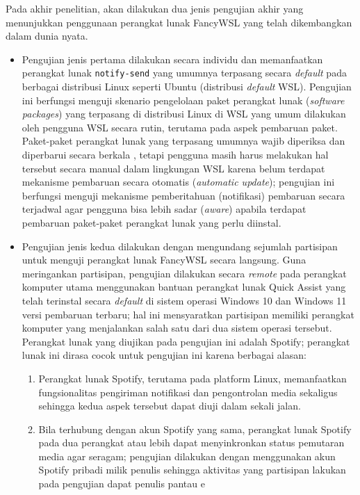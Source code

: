 Pada akhir penelitian, akan dilakukan dua jenis pengujian akhir yang menunjukkan penggunaan perangkat lunak FancyWSL yang telah dikembangkan dalam dunia nyata.
\begin{itemize}
    \item Pengujian jenis pertama dilakukan secara individu dan memanfaatkan perangkat lunak \verb|notify-send| yang umumnya terpasang secara \textit{default} pada berbagai distribusi Linux seperti Ubuntu (distribusi \textit{default} WSL). Pengujian ini berfungsi menguji skenario pengelolaan paket perangkat lunak (\textit{software packages}) yang terpasang di distribusi Linux di WSL yang umum dilakukan oleh pengguna WSL secara rutin, terutama pada aspek pembaruan paket. Paket-paket perangkat lunak yang terpasang umumnya wajib diperiksa dan diperbarui secara berkala \cite{legay2020package}, tetapi pengguna masih harus melakukan hal tersebut secara manual dalam lingkungan WSL karena belum terdapat mekanisme pembaruan secara otomatis (\textit{automatic update}); pengujian ini berfungsi menguji mekanisme pemberitahuan (notifikasi) pembaruan secara terjadwal agar pengguna bisa lebih sadar (\textit{aware}) apabila terdapat pembaruan paket-paket perangkat lunak yang perlu diinstal.

    \item Pengujian jenis kedua dilakukan dengan mengundang sejumlah partisipan untuk menguji perangkat lunak FancyWSL secara langsung. Guna meringankan partisipan, pengujian dilakukan secara \textit{remote} pada perangkat komputer utama menggunakan bantuan perangkat lunak Quick Assist yang telah terinstal secara \textit{default} di sistem operasi Windows 10 dan Windows 11 versi pembaruan terbaru; hal ini mensyaratkan partisipan memiliki perangkat komputer yang menjalankan salah satu dari dua sistem operasi tersebut. Perangkat lunak yang diujikan pada pengujian ini adalah Spotify; perangkat lunak ini dirasa cocok untuk pengujian ini karena berbagai alasan:
    \begin{enumerate}
        \item Perangkat lunak Spotify, terutama pada platform Linux, memanfaatkan fungsionalitas pengiriman notifikasi dan pengontrolan media sekaligus sehingga kedua aspek tersebut dapat diuji dalam sekali jalan.
        \item Bila terhubung dengan akun Spotify yang sama, perangkat lunak Spotify pada dua perangkat atau lebih dapat menyinkronkan status pemutaran media agar seragam; pengujian dilakukan dengan menggunakan akun Spotify pribadi milik penulis sehingga aktivitas yang partisipan lakukan pada pengujian dapat penulis pantau e
    \end{enumerate}
\end{itemize}
